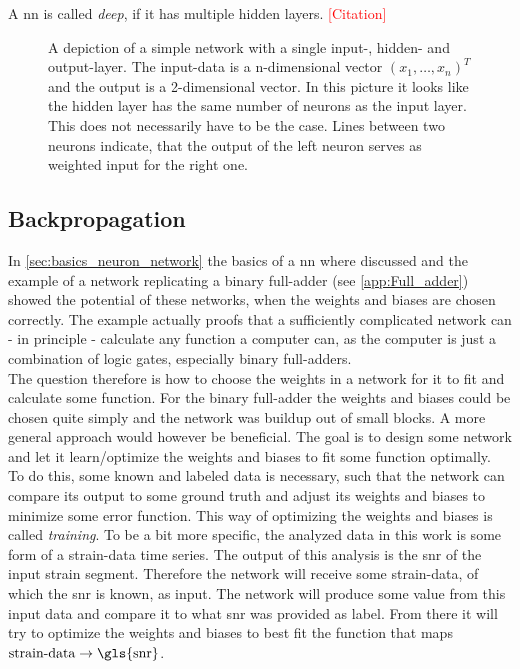 A \gls{nn} is called \emph{deep}, if it has multiple hidden layers. \textcolor{red}{[Citation]}
\begin{figure}
\centering

\caption{A depiction of a simple network with a single input-, hidden- and output-layer. The input-data is a n-dimensional vector ${(x_1, \dotsc, x_n)}^T$ and the output is a 2-dimensional vector. In this picture it looks like the hidden layer has the same number of neurons as the input layer. This does not necessarily have to be the case. Lines between two neurons indicate, that the output of the left neuron serves as weighted input for the right one.}\label{fig:hidden_layer}
\end{figure}

\subsection{Backpropagation}\label{sec:backpropagation}
In \autoref{sec:basics_neuron_network} the basics of a \gls{nn} where discussed and the example of a network replicating a binary full-adder (see \autoref{app:Full_adder}) showed the potential of these networks, when the weights and biases are chosen correctly. The example actually proofs that a sufficiently complicated network can - in principle - calculate any function a computer can, as the computer is just a combination of logic gates, especially binary full-adders.\\
The question therefore is how to choose the weights in a network for it to fit and calculate some function. For the binary full-adder the weights and biases could be chosen quite simply and the network was buildup out of small blocks. A more general approach would however be beneficial. The goal is to design some network and let it learn/optimize the weights and biases to fit some function optimally.\\
To do this, some known and labeled data is necessary, such that the network can compare its output to some ground truth and adjust its weights and biases to minimize some error function. This way of optimizing the weights and biases is called \emph{training}. To be a bit more specific, the analyzed data in this work is some form of a strain-data time series. The output of this analysis is the \gls{snr} of the input strain segment. Therefore the network will receive some strain-data, of which the \gls{snr} is known, as input. The network will produce some value from this input data and compare it to what \gls{snr} was provided as label. From there it will try to optimize the weights and biases to best fit the function that maps $\text{strain-data}\to\text{\gls{snr}}$.\\
